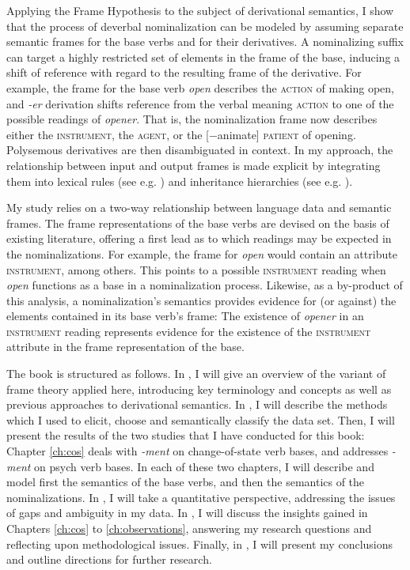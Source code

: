 Applying the Frame Hypothesis to the subject of derivational semantics, I show that the process of deverbal nominalization can be modeled by assuming separate semantic frames for the base verbs and for their derivatives. A nominalizing suffix can target a highly restricted set of elements in the frame of the base, inducing a shift of reference with regard to the resulting frame of the derivative. For example, the frame for the base verb \textit{open} describes the \textsc{action} of making open, and \textit{-er} derivation shifts reference from the verbal meaning \textsc{action} to one of the possible readings of \textit{opener}. That is, the nominalization frame now describes either the \textsc{instrument}, the \textsc{agent}, or the [−animate] \textsc{patient} of opening. Polysemous derivatives are then disambiguated in context. 
In my approach, the relationship between input and output frames is made explicit by integrating them into lexical rules (see e.g. \citealt[]{Sag.1999}) and inheritance hierarchies (see e.g. \citealt{Riehemann.1998}). 


My study relies on a two-way relationship between language data and semantic frames. The frame representations of the base verbs are devised on the basis of existing literature, offering a first lead as to which readings may be expected in the nominalizations. 
For example, the frame for \textit{open} would contain an attribute \textsc{instrument}, among others. This points to a possible \textsc{instrument} reading when \textit{open} functions as a base in a nominalization process. 
Likewise, as a by-product of this analysis, a nominalization's semantics provides evidence for (or against) the elements contained in its base verb's frame: The existence of \textit{opener} in an \textsc{instrument} reading represents evidence for the existence of the \textsc{instrument} attribute in the frame representation of the base. 

 The book is structured as follows.
In , I will give an overview of the variant of frame theory applied here, introducing key terminology and concepts as well as previous approaches to derivational semantics.
In , I will describe the methods which I used to elicit, choose and semantically classify the data set. 
Then, I will present the results of the two studies that I have conducted for this book: Chapter \ref{ch:cos} deals with \textit{-ment} on change-of-state verb bases, and  addresses \textit{-ment} on psych verb bases. In each of these two chapters, I will describe and model first the semantics of the base verbs, and then the semantics of the nominalizations. 
In , I will take a quantitative perspective, addressing the issues of gaps and ambiguity in my data.
In , I will discuss the insights gained in Chapters \ref{ch:cos} to \ref{ch:observations}, answering my research questions and reflecting upon methodological issues. 
Finally, in , I will present my conclusions and outline directions for further research.
